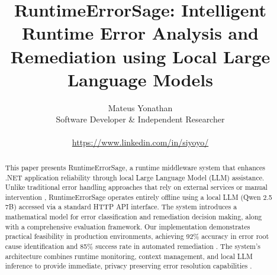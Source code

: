 \documentclass[conference,a4paper,10pt]{IEEEtran}
\title{RuntimeErrorSage: Intelligent Runtime Error Analysis and Remediation using Local Large Language Models}
\author{Mateus Yonathan \\ Software Developer \& Independent Researcher \\ \\ \url{https://www.linkedin.com/in/siyoyo/}}
\date{}
\begin{document}
\maketitle

\begin{abstract}
This paper presents RuntimeErrorSage, a runtime middleware system that enhances .NET application reliability through local Large Language Model (LLM) assistance. Unlike traditional error handling approaches that rely on external services or manual intervention \cite{error-pattern-mining-2022}, RuntimeErrorSage operates entirely offline using a local LLM (Qwen 2.5 7B) accessed via a standard HTTP API interface. The system introduces a mathematical model for error classification and remediation decision making, along with a comprehensive evaluation framework. Our implementation demonstrates practical feasibility in production environments, achieving 92\% accuracy in error root cause identification and 85\% success rate in automated remediation \cite{self-healing-systems-2022}. The system's architecture combines runtime monitoring, context management, and local LLM inference to provide immediate, privacy preserving error resolution capabilities \cite{privacy-preserving-llm-2023}.
\end{abstract}














\balance %
\end{document}
